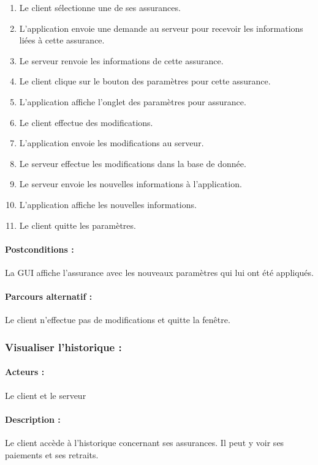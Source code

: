 \documentclass[../annexe.tex]{subfiles}
\begin{document}
	\begin{enumerate}
		\item Le client sélectionne une de ses assurances.
		\item L'application envoie une demande au serveur pour recevoir les informations liées à cette assurance.
		\item Le serveur renvoie les informations de cette assurance.
		\item Le client clique sur le bouton des paramètres pour cette assurance.
		\item L'application affiche l'onglet des paramètres pour assurance.
		\item Le client effectue des modifications.
		\item L'application envoie les modifications au serveur.
		\item Le serveur effectue les modifications dans la base de donnée.
		\item Le serveur envoie les nouvelles informations à l'application.
		\item L'application affiche les nouvelles informations.
		\item Le client quitte les paramètres.
	\end{enumerate}

\paragraph{Postconditions :} La GUI affiche l'assurance avec les nouveaux paramètres qui lui ont été appliqués.

\paragraph{Parcours alternatif :} Le client n'effectue pas de modifications et quitte la fenêtre.

\newpage

\subsubsection{Visualiser l'historique :}

\paragraph{Acteurs :} Le client et le serveur 

\paragraph{Description :} Le client accède à l'historique concernant ses assurances. Il peut y voir ses paiements et ses retraits.
\end{document}
